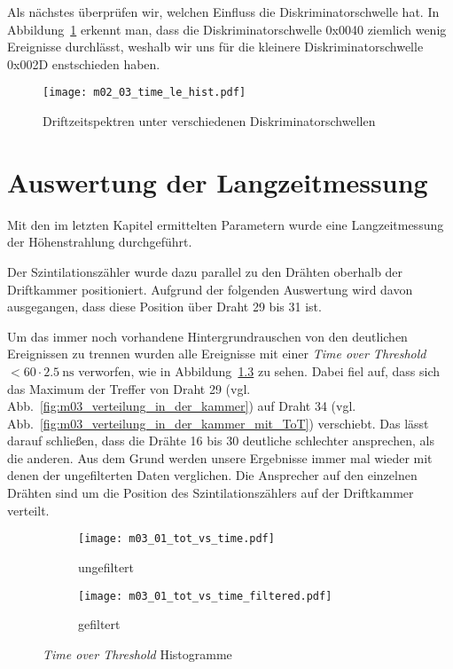 \documentclass[11pt, ngerman, fleqn, DIV=15, headinclude, BCOR=2cm]{scrreprt}
\begin{document}
Als nächstes überprüfen wir, welchen Einfluss die Diskriminatorschwelle hat. In
Abbildung~\ref{fig:m02_03_driftzeitspektrum} erkennt man, dass die
Diskriminatorschwelle 0x0040 ziemlich wenig Ereignisse durchlässt, weshalb wir
uns für die kleinere Diskriminatorschwelle 0x002D enstschieden haben.

\begin{figure}
    \centering
    \texttt{[image: m02\_03\_time\_le\_hist.pdf]}
    \caption{%
	    Driftzeitspektren unter verschiedenen Diskriminatorschwellen
   }
    \label{fig:m02_03_driftzeitspektrum}
\end{figure}




\clearpage


\chapter{Auswertung der Langzeitmessung}

Mit den im letzten Kapitel ermittelten Parametern wurde eine Langzeitmessung
der Höhenstrahlung durchgeführt.

Der Szintilationszähler wurde dazu parallel zu den Drähten oberhalb der
Driftkammer positioniert. Aufgrund der folgenden Auswertung wird davon
ausgegangen, dass diese Position über Draht 29 bis 31 ist.

Um das immer noch vorhandene Hintergrundrauschen von den deutlichen
Ereignissen zu trennen wurden alle Ereignisse mit einer \emph{Time over
Threshold} $ < 60 \cdot \SI{2.5}{\nano\second}$ verworfen, wie in 
Abbildung~\ref{fig:m03_tot_vs_time} zu sehen.
Dabei fiel auf, dass sich das Maximum der Treffer von Draht 29
(vgl. Abb.~\ref{fig:m03_verteilung_in_der_kammer}) auf Draht 34 (vgl.
Abb.~\ref{fig:m03_verteilung_in_der_kammer_mit_ToT}) verschiebt. Das lässt
darauf schließen, dass die Drähte 16 bis 30 deutliche schlechter ansprechen,
als die anderen. Aus dem Grund werden unsere Ergebnisse immer mal wieder mit
denen der ungefilterten Daten verglichen.
Die Ansprecher auf den einzelnen Drähten sind um die Position des
Szintilationszählers auf der Driftkammer verteilt.


\begin{figure}
	\centering
	\begin{subfigure}{0.49 \linewidth}
		\texttt{[image: m03\_01\_tot\_vs\_time.pdf]}
		\caption{%
			ungefiltert
		}
		\label{fig:m03_tot_vs_time_unfiltered}
	\end{subfigure}
	\begin{subfigure}{0.49 \linewidth}
		\texttt{[image: m03\_01\_tot\_vs\_time\_filtered.pdf]}
		\caption{%
			gefiltert
		}
		\label{fig:m03_tot_vs_time_filtered}
	\end{subfigure}
	\caption{%
		\emph{Time over Threshold} Histogramme
	}
	\label{fig:m03_tot_vs_time}
\end{figure}
\end{document}
